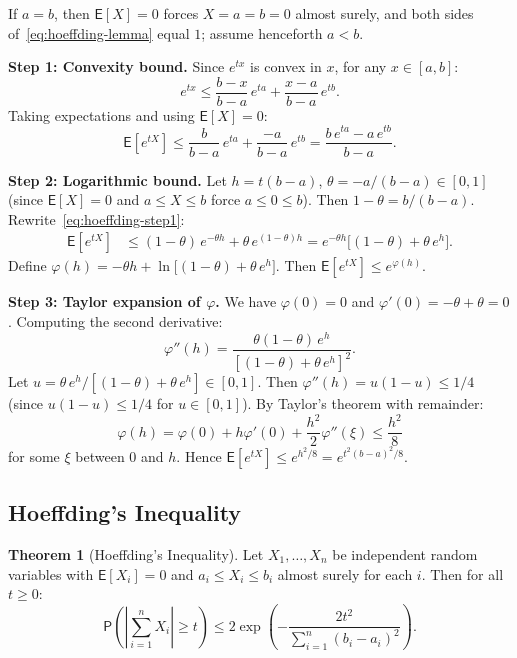 \documentclass[12pt,a4paper]{article}
\makeatletter
\theoremstyle{definition}
\newtheorem{theorem}{Theorem}[section]
\renewenvironment{proof}[1][\proofname]{\par
  \pushQED{\qed}%
  \normalfont \topsep6\p@\@plus6\p@\relax
  \trivlist
  \item[\hskip\labelsep\bfseries #1\@addpunct{.}]\ignorespaces
}{%
  \popQED\endtrivlist\@endpefalse
}
\newcommand\expc{\mathsf{E}}
\newcommand\prb{\mathsf{P}}
\makeatother
\begin{document}
\begin{proof}
If $a = b$, then $\expc[X] = 0$ forces $X = a = b = 0$ almost surely, and both sides of~\eqref{eq:hoeffding-lemma} equal $1$; assume henceforth $a < b$.

\textbf{Step 1: Convexity bound.} Since $e^{tx}$ is convex in $x$, for any $x \in [a, b]$:
\[
e^{tx} \leqslant \frac{b - x}{b - a}\,e^{ta} + \frac{x - a}{b - a}\,e^{tb}.
\]
Taking expectations and using $\expc[X] = 0$:
\begin{equation}\label{eq:hoeffding-step1}
\expc[e^{tX}] \leqslant \frac{b}{b - a}\,e^{ta} + \frac{-a}{b - a}\,e^{tb} = \frac{b\,e^{ta} - a\,e^{tb}}{b - a}.
\end{equation}

\textbf{Step 2: Logarithmic bound.} Let $h = t(b-a)$, $\theta = -a/(b-a) \in [0,1]$ (since $\expc[X] = 0$ and $a \leqslant X \leqslant b$ force $a \leqslant 0 \leqslant b$). Then $1 - \theta = b/(b-a)$. Rewrite~\eqref{eq:hoeffding-step1}:
\begin{align*}
\expc[e^{tX}] &\leqslant (1-\theta)\,e^{-\theta h} + \theta\,e^{(1-\theta)h} = e^{-\theta h}\bigl[(1-\theta) + \theta\,e^{h}\bigr].
\end{align*}
Define $\varphi(h) = -\theta h + \ln\bigl[(1-\theta) + \theta\,e^h\bigr]$. Then $\expc[e^{tX}] \leqslant e^{\varphi(h)}$.

\textbf{Step 3: Taylor expansion of $\varphi$.} We have $\varphi(0) = 0$ and $\varphi'(0) = -\theta + \theta = 0$. Computing the second derivative:
\[
\varphi''(h) = \frac{\theta(1-\theta)\,e^h}{[(1-\theta) + \theta\,e^h]^2}.
\]
Let $u = \theta\,e^h/[(1-\theta) + \theta\,e^h] \in [0,1]$. Then $\varphi''(h) = u(1-u) \leqslant 1/4$ (since $u(1-u) \leqslant 1/4$ for $u \in [0,1]$). By Taylor's theorem with remainder:
\[
\varphi(h) = \varphi(0) + h\varphi'(0) + \frac{h^2}{2}\varphi''(\xi) \leqslant \frac{h^2}{8}
\]
for some $\xi$ between $0$ and $h$. Hence $\expc[e^{tX}] \leqslant e^{h^2/8} = e^{t^2(b-a)^2/8}$.
\end{proof}

\subsection{Hoeffding's Inequality}

\begin{theorem}[Hoeffding's Inequality]\label{thm:hoeffding}
Let $X_1, \ldots, X_n$ be independent random variables with $\expc[X_i] = 0$ and $a_i \leqslant X_i \leqslant b_i$ almost surely for each $i$. Then for all $t \geqslant 0$:
\begin{equation}\label{eq:hoeffding}
\boxed{\prb\!\left(\left|\sum_{i=1}^n X_i\right| \geqslant t\right) \leqslant 2\exp\!\left(-\frac{2t^2}{\sum_{i=1}^n (b_i - a_i)^2}\right).}
\end{equation}
\end{theorem}
\end{document}
